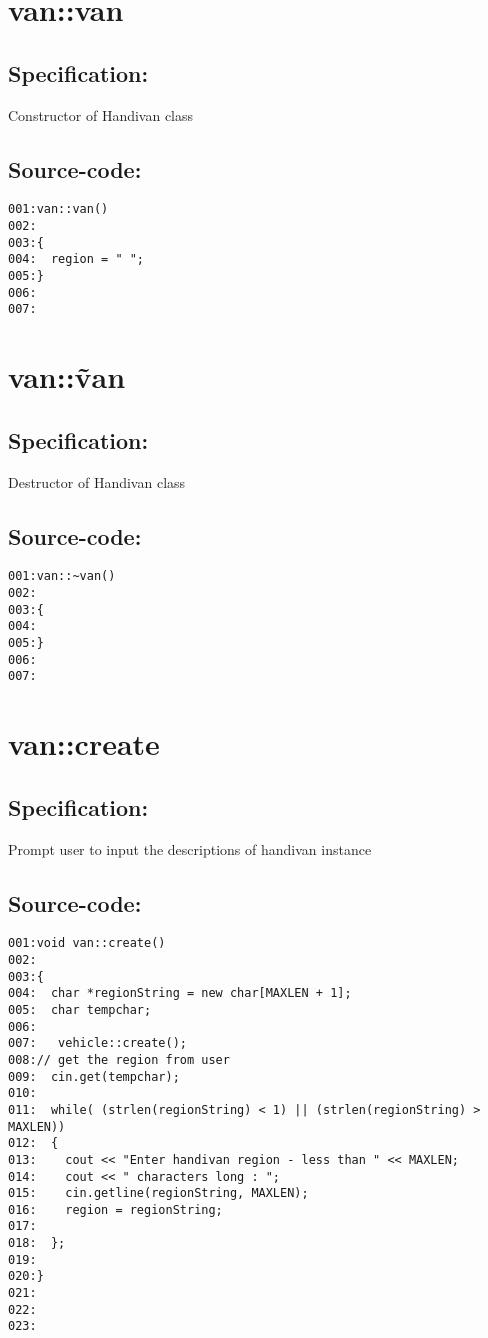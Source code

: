 \section{van::van}
\subsection*{Specification:}
Constructor of Handivan class
\subsection*{Source-code:}
\begin{verbatim}
001:van::van()
002:
003:{
004:  region = " ";
005:}
006:
007:
\end{verbatim}
\section{van::\~van}
\subsection*{Specification:}
Destructor of Handivan class
\subsection*{Source-code:}
\begin{verbatim}
001:van::~van()
002:
003:{
004:  
005:}
006:
007:
\end{verbatim}
\section{van::create}
\subsection*{Specification:}
Prompt user to input the descriptions of handivan instance
\subsection*{Source-code:}
\begin{verbatim}
001:void van::create()
002:
003:{
004:  char *regionString = new char[MAXLEN + 1];
005:  char tempchar;
006:
007:   vehicle::create();
008:// get the region from user
009:  cin.get(tempchar);
010:  
011:  while( (strlen(regionString) < 1) || (strlen(regionString) > MAXLEN))
012:  {
013:    cout << "Enter handivan region - less than " << MAXLEN;
014:    cout << " characters long : ";
015:    cin.getline(regionString, MAXLEN);
016:    region = regionString;
017:    
018:  };
019:
020:}
021:
022:
023:
\end{verbatim}
